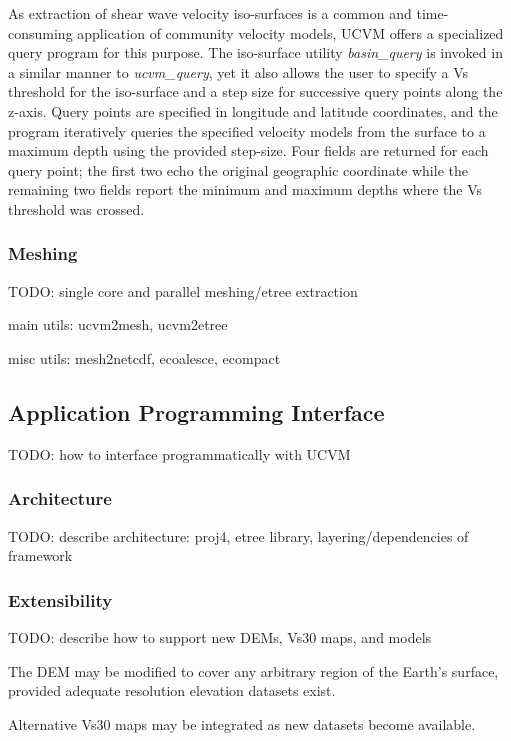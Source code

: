 As extraction of shear wave velocity iso-surfaces is a common and time-consuming application of community velocity models, UCVM offers a specialized query program for this purpose. The iso-surface utility \emph{basin\_query} is invoked in a similar manner to \emph{ucvm\_query}, yet it also allows the user to specify a Vs threshold for the iso-surface and a step size for successive query points along the z-axis. Query points are specified in longitude and latitude coordinates, and the program iteratively queries the specified velocity models from the surface to a maximum depth using the provided step-size. Four fields are returned for each query point; the first two echo the original geographic coordinate while the remaining two fields report the minimum and maximum depths where the Vs threshold was crossed.

\subsubsection{Meshing}

TODO: single core and parallel meshing/etree extraction

main utils: ucvm2mesh, ucvm2etree

misc utils: mesh2netcdf, ecoalesce, ecompact

\subsection{Application Programming Interface}

TODO: how to interface programmatically with UCVM

\subsubsection{Architecture}

TODO: describe architecture: proj4, etree library, layering/dependencies of framework

\subsubsection{Extensibility}

TODO: describe how to support new DEMs, Vs30 maps, and models

The DEM may be modified to cover any arbitrary region of the Earth's surface, provided adequate resolution elevation datasets exist.

Alternative Vs30 maps may be integrated as new datasets become available. 

